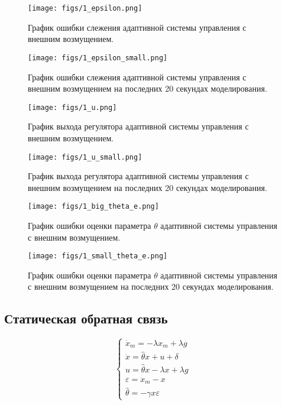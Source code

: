 \documentclass{article}
\begin{document}
\begin{figure}[h!]
  \centering
  \texttt{[image: figs/1\_epsilon.png]}
  \caption{График ошибки слежения адаптивной системы управления с внешним возмущением.} 
  \label{fig:1_epsilon}
\end{figure}

\begin{figure}[h!]
  \centering
  \texttt{[image: figs/1\_epsilon\_small.png]}
  \caption{График ошибки слежения адаптивной системы управления с внешним возмущением на последних 20 секундах моделирования.} 
  \label{fig:1_epsilon_small}
\end{figure}

\begin{figure}[h!]
  \centering
  \texttt{[image: figs/1\_u.png]}
  \caption{График выхода регулятора адаптивной системы управления с внешним возмущением.} 
  \label{fig:1_u}
\end{figure}

\begin{figure}[h!]
  \centering
  \texttt{[image: figs/1\_u\_small.png]}
  \caption{График выхода регулятора адаптивной системы управления с внешним возмущением на последних 20 секундах моделирования.} 
  \label{fig:1_u_small}
\end{figure}

\begin{figure}[h!]
  \centering
  \texttt{[image: figs/1\_big\_theta\_e.png]}
  \caption{График ошибки оценки параметра $\theta$ адаптивной системы управления с внешним возмущением.} 
  \label{fig:1_big_theta_e}
\end{figure}

\begin{figure}[h!]
  \centering
  \texttt{[image: figs/1\_small\_theta\_e.png]}
  \caption{График ошибки оценки параметра $\theta$ адаптивной системы управления с внешним возмущением на последних 20 секундах моделирования.} 
  \label{fig:1_small_theta_e}
\end{figure}
\FloatBarrier
\subsection{Статическая обратная связь}

\[
\begin{cases}
    \dot x_m = -\lambda x_m + \lambda g    \\
    \dot x = \hat \theta x + u + \delta\\
    u = \hat \theta x - \lambda x + \lambda g \\
    \varepsilon = x_m - x \\ 
    \hat \theta = -\gamma x \varepsilon
\end{cases}
\]\\
\end{document}
